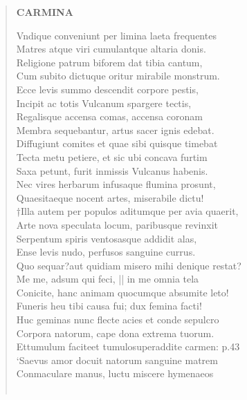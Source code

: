 \documentclass[11pt, a4paper]{report}
\begin{document}
\begin{verse}
    \begin{center} \textbf{CARMINA} \end{center} \marginpar{[78]} Vndique conveniunt per limina laeta frequentes \\ Matres atque viri cumulantque altaria donis. \\ Religione patrum biforem dat tibia cantum, \\ Cum subito dictuque oritur mirabile monstrum. \\ Ecce levis summo descendit corpore pestis, \\ Incipit ac totis Vulcanum spargere tectis, \\ Regalisque accensa comas, accensa coronam \\ Membra sequebantur, artus sacer ignis edebat. \\ Diffugiunt comites et quae sibi quisque timebat \\ Tecta metu petiere, et sic ubi concava furtim \\ Saxa petunt, furit inmissis Vulcanus habenis. \\ Nec vires herbarum infusaque flumina prosunt, \\ Quaesitaeque nocent artes, miserabile dictu! \\ †Illa autem per populos aditumque per avia quaerit, \\ Arte nova speculata locum, paribusque revinxit \\ Serpentum spiris ventosasque addidit alas, \\ Ense levis nudo, perfusos sanguine currus. \\ Quo sequar?aut quidiam misero mihi denique restat? \\ Me me, adsum qui feci, || in me omnia tela \\ Conicite, hanc animam quocumque absumite leto! \\ Funeris heu tibi causa fui; dux femina facti! \\ Huc geminas nunc flecte acies et conde sepulcro \\ Corpora natorum, cape dona extrema tuorum. \\ Ettumulum faciteet tumulosuperaddite carmen: p.43 \\ ‘Saevus amor docuit natorum sanguine matrem \\ Conmaculare manus, luctu miscere hymenaeos \\ 
        ﻿\pagebreak 

\end{verse}
\end{document}
